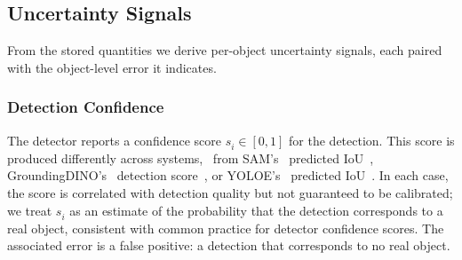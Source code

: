 \subsection{Uncertainty Signals}
\label{sec:uncertainty-signals}

From the stored quantities we derive per-object uncertainty signals, each paired with the object-level error it indicates.

\subsubsection{Detection Confidence}
The detector reports a confidence score $s^{}_i \in [0,1]$ for the detection. This score is produced differently across systems,~\eg{} from SAM's~\cite{kirillov2023segment} predicted IoU~\cite{werby2024hierarchical}, GroundingDINO's~\cite{liu2023grounding} detection score~\cite{ zumaya2026occupancy},  or YOLOE's~\cite{wang2025yoloe} predicted IoU~\cite{puigjaner2026relationship}. In each case, the score is correlated with detection quality but not guaranteed to be calibrated; we treat $s^{}_i$ as an estimate of the probability that the detection corresponds to a real object, consistent with common practice for detector confidence scores. The associated error is a false positive: a detection that corresponds to no real object.

